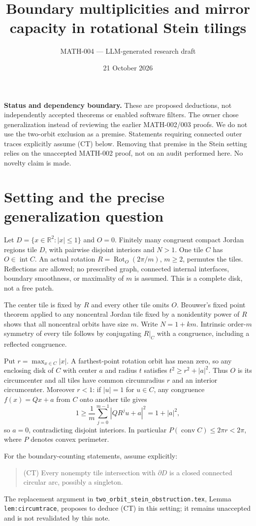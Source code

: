 \documentclass[11pt]{article}
\title{Boundary multiplicities and mirror capacity in rotational Stein tilings}
\author{MATH-004 --- LLM-generated research draft}
\date{21 October 2026}
\newcommand{\Int}{\operatorname{int}}
\newcommand{\conv}{\operatorname{conv}}
\newcommand{\Rot}{\operatorname{Rot}}
\begin{document}
\maketitle

\noindent\textbf{Status and dependency boundary.}
These are proposed deductions, not independently accepted theorems or enabled
software filters. The owner chose generalization instead of reviewing the
earlier MATH-002/003 proofs. We do not use the two-orbit exclusion as a premise.
Statements requiring connected outer traces explicitly assume \textup{(CT)}
below. Removing that premise in the Stein setting relies on the unaccepted
MATH-002 proof, not on an audit performed here. No novelty claim is made.

\section{Setting and the precise generalization question}

Let $D=\{x\in\mathbb R^2:|x|\leq1\}$ and $O=0$. Finitely many congruent
compact Jordan regions tile $D$, with pairwise disjoint interiors and $N>1$.
One tile $C$ has $O\in\Int C$. An actual rotation
$R=\Rot_O(2\pi/m)$, $m\geq2$, permutes the tiles. Reflections are allowed;
no prescribed graph, connected internal interfaces, boundary smoothness, or
maximality of $m$ is assumed. This is a complete disk, not a free patch.

The center tile is fixed by $R$ and every other tile omits $O$. Brouwer's fixed
point theorem applied to any noncentral Jordan tile fixed by a nonidentity
power of $R$ shows that all noncentral orbits have size $m$. Write
$N=1+km$. Intrinsic order-$m$ symmetry of every tile follows by conjugating
$R|_C$ with a congruence, including a reflected congruence.

Put $r=\max_{x\in C}|x|$. A farthest-point rotation orbit has mean zero, so
any enclosing disk of $C$ with center $a$ and radius $t$ satisfies
$t^2\geq r^2+|a|^2$. Thus $O$ is its circumcenter and all tiles have common
circumradius $r$ and an interior circumcenter. Moreover $r<1$: if $|u|=1$
for $u\in C$, any congruence $f(x)=Qx+a$ from $C$ onto another tile gives
\[
 1\geq\frac1m\sum_{j=0}^{m-1}|QR^ju+a|^2=1+|a|^2,
\]
so $a=0$, contradicting disjoint interiors. In particular
$P(\conv C)\leq2\pi r<2\pi$, where $P$ denotes convex perimeter.

For the boundary-counting statements, assume explicitly:
\begin{quote}
\textup{(CT)} Every nonempty tile intersection with $\partial D$ is a
closed connected circular arc, possibly a singleton.
\end{quote}
The replacement argument in \texttt{two\_orbit\_stein\_obstruction.tex},
Lemma \texttt{lem:circumtrace}, proposes to deduce (CT) in this setting;
it remains unaccepted and is not revalidated by this note.
\end{document}
